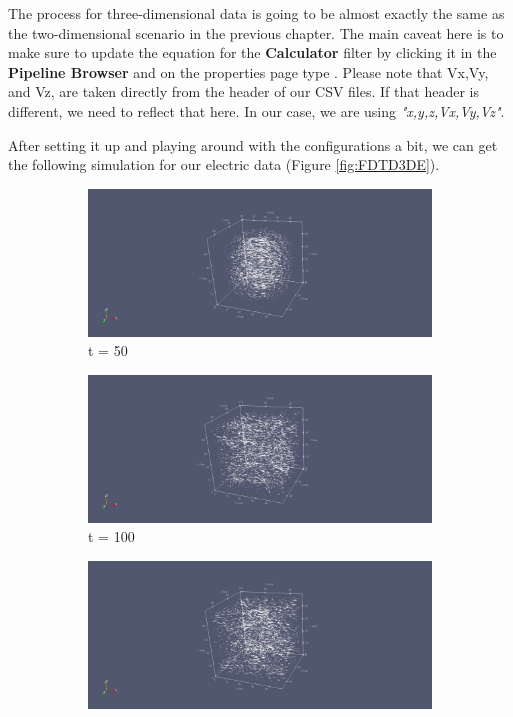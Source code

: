 The process for three-dimensional data is going to be almost exactly the same as the two-dimensional scenario in the previous chapter. The main caveat here is to make sure to update the equation for the \textbf{Calculator} filter by clicking it in the \textbf{Pipeline Browser} and on the properties page type . Please note that Vx,Vy, and Vz, are taken directly from the header of our CSV files. If that header is different, we need to reflect that here. In our case, we are using \textit{"x,y,z,Vx,Vy,Vz"}.

After setting it up and playing around with the configurations a bit, we can get the following simulation for our electric data (Figure \ref{fig:FDTD3DE}).

\begin{figure}[h!]
	\centering
	\begin{subfigure}{.49\textwidth}
		\centering
		\includegraphics[width=.95\linewidth]{Figures/FDTD3DE1}
		\caption{t = 50}
	\end{subfigure}
	\begin{subfigure}{.49\textwidth}
		\centering
		\includegraphics[width=.95\linewidth]{Figures/FDTD3DE2}
		\caption{t = 100}
	\end{subfigure}
	\begin{subfigure}{.49\textwidth}
		\centering
		\includegraphics[width=.95\linewidth]{Figures/FDTD3DE3}

\end{subfigure}
\end{figure}
